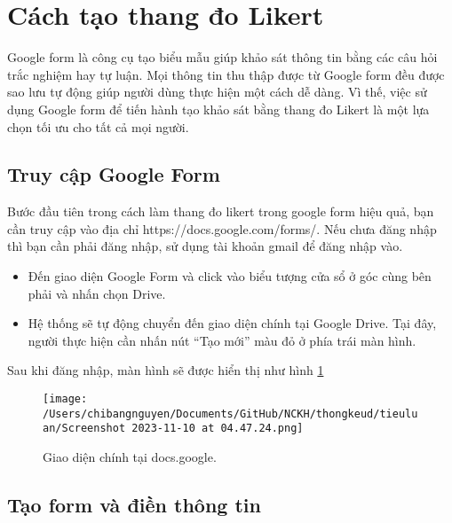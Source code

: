 \documentclass[12pt]{article}
\begin{document}
\section{Cách tạo thang đo Likert}
\phantom{}

Google form là công cụ tạo biểu mẫu giúp khảo sát thông tin bằng các câu hỏi trắc nghiệm hay tự luận. Mọi thông tin thu thập được từ Google form đều được sao lưu tự động giúp người dùng thực hiện một cách dễ dàng. Vì thế, việc sử dụng Google form để tiến hành tạo khảo sát bằng thang đo Likert là một lựa chọn tối ưu cho tất cả mọi người.

\vspace{1cm}

\subsection{Truy cập Google Form}

\vspace{.5cm}

Bước đầu tiên trong cách làm thang đo likert trong google form hiệu quả, bạn cần truy cập vào địa chỉ https://docs.google.com/forms/. Nếu chưa đăng nhập thì bạn cần phải đăng nhập, sử dụng tài khoản gmail để đăng nhập vào.

\begin{itemize}
\item Đến giao diện Google Form và click vào biểu tượng cửa sổ ở góc cùng bên phải và nhấn chọn Drive. 
\item Hệ thống sẽ tự động chuyển đến giao diện chính tại Google Drive. Tại đây, người thực hiện cần nhấn nút “Tạo mới” màu đỏ ở phía trái màn hình.
\end{itemize}

Sau khi đăng nhập, màn hình sẽ được hiển thị như hình \ref{1}
\begin{figure} 
    \centering
    \texttt{[image: /Users/chibangnguyen/Documents/GitHub/NCKH/thongkeud/tieuluan/Screenshot 2023-11-10 at 04.47.24.png]}
    \caption{Giao diện chính tại docs.google.}
    \label{1}
\end{figure}

\vspace{1cm}

\subsection{Tạo form và điền thông tin}

\vspace{.5cm}
\end{document}
